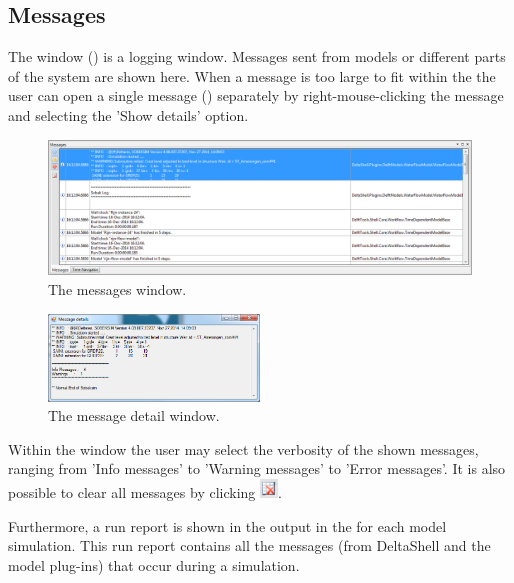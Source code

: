 \subsection{Messages}
\label{subsec:messages}
%
The  window () is a logging window. Messages sent from models or different parts of the system are shown here. When a message is too large to fit within the  the user can open a single message () separately by right-mouse-clicking the message and selecting the 'Show details' option.
%
\begin{figure} [H]
	\centering
		\includegraphics[width=\textwidth]{figures/chapter_overview/view_messages_window.png}
	\caption{The messages window.}
	\label{fig:messageswindow}
\end{figure}
%
\begin{figure} [H]
	\centering
		\includegraphics[width=0.5\textwidth]{figures/chapter_overview/view_messagedetails_window.png}
	\caption{The message detail window.}
	\label{fig:messagedetailwindow}
\end{figure} 

Within the  window the user may select the verbosity of the shown messages, ranging from 'Info messages' to 'Warning messages' to 'Error messages'. It is also possible to clear all messages by clicking \includegraphics[height=5mm]{figures/chapter_overview/icon_clear_all_messages}.

Furthermore, a run report is shown in the output in the  for each model simulation. This run report contains all the messages (from DeltaShell and the model plug-ins) that occur during a simulation.

